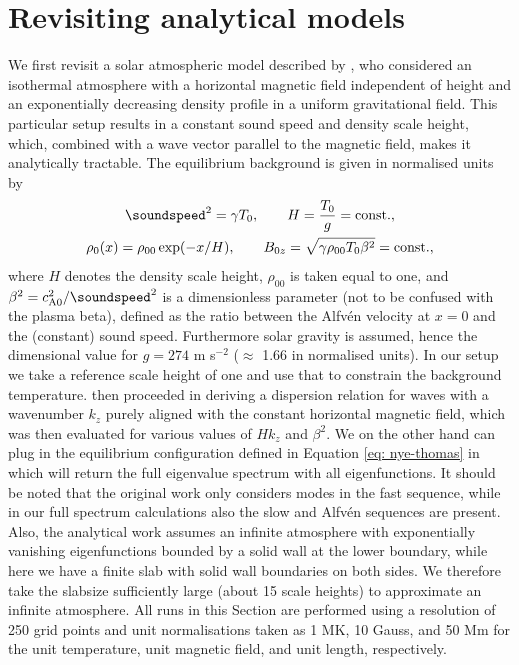 \section{Revisiting analytical models} \label{sec: analytical_work}
We first revisit a solar atmospheric model described by \citet{nye1976}, who considered an isothermal atmosphere with a horizontal magnetic field independent of height and an exponentially decreasing density profile in a uniform gravitational field. This particular setup results in a constant sound speed and density scale height, which, combined with a wave vector parallel to the magnetic field, makes it analytically tractable. The equilibrium background is given in normalised units by
\begin{equation} \label{eq: nye-thomas}
  \begin{gathered}
    \soundspeed^2 = \gamma T_0,
    \qquad
    H = \frac{T_0}{g} = \text{const.}, \\
    \rho_0(x) = \rho_{00}\exp(-x/H),
    \qquad
    B_{0z} = \sqrt{\gamma \rho_{00}T_0 \beta^2} = \text{const.},
  \end{gathered}
\end{equation}
where $H$ denotes the density scale height, $\rho_{00}$ is taken equal to one, and $\beta^2 = c_\text{A0}^2/\soundspeed^2$ is a dimensionless parameter (not to be confused with the plasma beta), defined as the ratio between the Alfv\'en velocity at $x = 0$ and the (constant) sound speed. Furthermore solar gravity is assumed, hence the dimensional value for $g = 274$ m s$^{-2}$ ($\approx$ 1.66 in normalised units). In our setup we take a reference scale height of one and use that to constrain the background temperature. \citet{nye1976} then proceeded in deriving a dispersion relation for waves with a wavenumber $k_z$ purely aligned with the constant horizontal magnetic field, which was then evaluated for various values of $Hk_z$ and $\beta^2$. We on the other hand can plug in the equilibrium configuration defined in Equation \eqref{eq: nye-thomas} in {\legolas} which will return the full eigenvalue spectrum with all eigenfunctions. It should be noted that the original work only considers modes in the fast sequence, while in our full spectrum calculations also the slow and Alfv\'en sequences are present. Also, the analytical work assumes an infinite atmosphere with exponentially vanishing eigenfunctions bounded by a solid wall at the lower boundary, while here we have a finite slab with solid wall boundaries on both sides. We therefore take the slabsize sufficiently large (about 15 scale heights) to approximate an infinite atmosphere. All runs in this Section are performed using a resolution of 250 grid points and unit normalisations taken as 1 MK, 10 Gauss, and 50 Mm for the unit temperature, unit magnetic field, and unit length, respectively.


